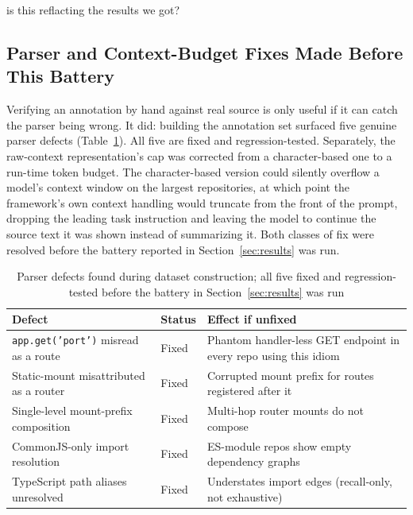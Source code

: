 is this reflacting the results we got?\documentclass[conference]{IEEEtran}
\begin{document}
\subsection{Parser and Context-Budget Fixes Made Before This Battery}
\label{sec:defects}
Verifying an annotation by hand against real source is only useful if it can catch the parser
being wrong. It did: building the annotation set surfaced five genuine parser defects
(Table~\ref{tab:defects}). All five are fixed and regression-tested. Separately, the
raw-context representation's cap was corrected from a character-based one to a run-time token
budget. The character-based version could silently overflow a model's context window on the
largest repositories, at which point the framework's own context handling would truncate from
the front of the prompt, dropping the leading task instruction and leaving the model to continue
the source text it was shown instead of summarizing it. Both classes of fix were resolved before
the battery reported in Section~\ref{sec:results} was run.

\begin{table}[htbp]
\caption{Parser defects found during dataset construction; all five fixed and regression-tested
before the battery in Section~\ref{sec:results} was run}
\label{tab:defects}
\centering
\footnotesize
\begin{tabular}{@{}p{1.9cm}p{0.9cm}p{3.4cm}@{}}
\toprule
Defect & Status & Effect if unfixed \\
\midrule
\texttt{app.get('port')} misread as a route & Fixed & Phantom handler-less GET endpoint in every repo using this idiom \\
Static-mount misattributed as a router & Fixed & Corrupted mount prefix for routes registered after it \\
Single-level mount-prefix composition & Fixed & Multi-hop router mounts do not compose \\
CommonJS-only import resolution & Fixed & ES-module repos show empty dependency graphs \\
TypeScript path aliases unresolved & Fixed & Understates import edges (recall-only, not exhaustive) \\
\bottomrule
\end{tabular}
\end{table}
\end{document}
